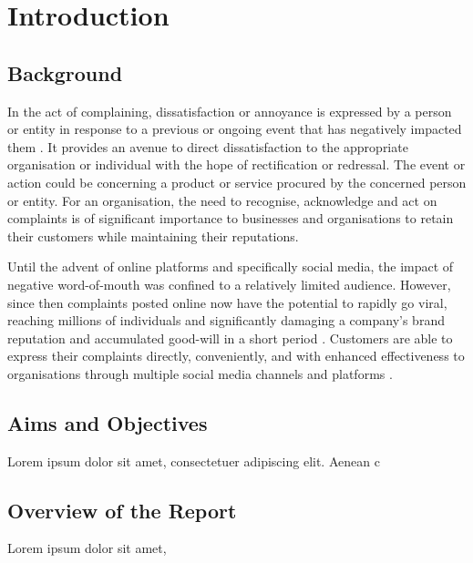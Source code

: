 \chapter{Introduction}

\section{Background}

In the act of complaining, dissatisfaction or annoyance is expressed by a person or entity in response to a previous or ongoing event that has negatively impacted them \cite{olshtain_speechact_1987}. It provides an avenue to direct dissatisfaction to the appropriate organisation or individual with the hope of rectification or redressal. The event or action could be concerning a product or service procured by the concerned person or entity. For an organisation, the need to recognise, acknowledge and act on complaints is of significant importance to businesses and organisations to retain their customers while maintaining their reputations.

Until the advent of online platforms and specifically social media, the impact of negative word-of-mouth was confined to a relatively limited audience. However, since then complaints posted online now have the potential to rapidly go viral, reaching millions of individuals and significantly damaging a company's brand reputation and accumulated good-will in a short period \cite{tripp_when_2011}. Customers are able to express their complaints directly, conveniently, and with enhanced effectiveness to organisations through  multiple social media channels and platforms \cite{balaji_customer_2015}.



\section{Aims and Objectives}

Lorem ipsum dolor sit amet, consectetuer adipiscing elit. Aenean c

\section{Overview of the Report}

Lorem ipsum dolor sit amet, 
